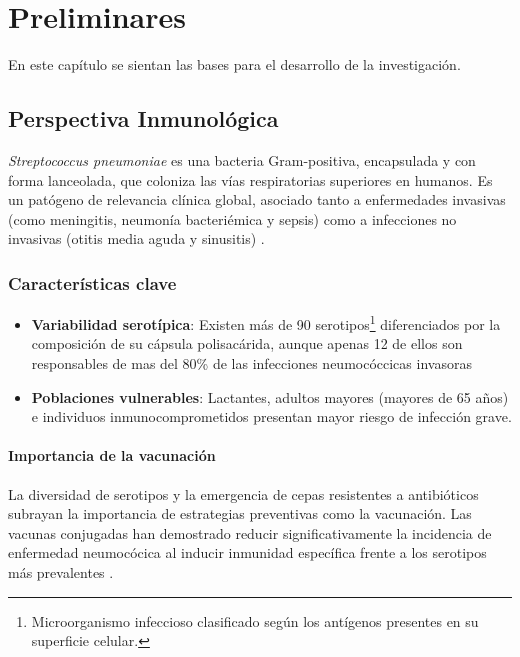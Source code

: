 \chapter{Preliminares}\label{chapter:preliminares}

En este capítulo se sientan las bases para el desarrollo de la investigación.

\section{Perspectiva Inmunológica}

\textit{Streptococcus pneumoniae} es una bacteria Gram-positiva, encapsulada y con forma lanceolada, que coloniza las vías respiratorias superiores en humanos. Es un patógeno de relevancia clínica global, asociado tanto a enfermedades invasivas (como meningitis, neumonía bacteriémica y sepsis) como a infecciones no invasivas (otitis media aguda y sinusitis) \cite{WHO2019}.



\subsection{Características clave}
\begin{itemize}
    \item \textbf{Variabilidad serotípica}: Existen más de 90 serotipos\footnote{Microorganismo infeccioso clasificado según los antígenos presentes en su superficie celular.} diferenciados por la composición de su cápsula polisacárida, aunque apenas 12 de ellos son responsables de mas del 80\% de las infecciones neumocóccicas invasoras \cite{PREADOJ2001}
    \item \textbf{Poblaciones vulnerables}: Lactantes, adultos mayores (mayores de 65 años) e individuos inmunocomprometidos presentan mayor riesgo de infección grave.
\end{itemize}

\subsubsection{Importancia de la vacunación}
La diversidad de serotipos y la emergencia de cepas resistentes a antibióticos subrayan la importancia de estrategias preventivas como la vacunación. Las vacunas conjugadas han demostrado reducir significativamente la incidencia de enfermedad neumocócica al inducir inmunidad específica frente a los serotipos más prevalentes \cite{Snedecor2020a}.

